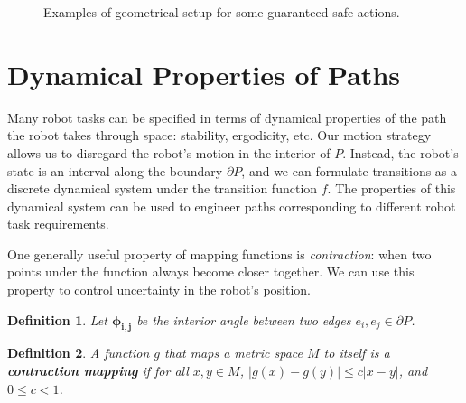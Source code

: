 \documentclass[]{article}
\newtheorem{definition}{Definition}
\begin{document}
\begin{figure}
\begin{subfigure}{0.4\textwidth}
\centering
{}
\end{subfigure}
\caption{Examples of geometrical setup for some guaranteed safe actions.}
\label{fig:two_safe_cases}
\end{figure}


\section{Dynamical Properties of Paths} \label{secdyn}


Many robot tasks can be specified in terms of dynamical properties of
the path the robot takes through space: stability, ergodicity, etc.
Our motion strategy allows us to disregard the robot's motion in the interior of
$P$. Instead, the robot's state is an interval 
along the boundary $\partial P$, and we can formulate transitions as a discrete
dynamical system under the transition function $f$. The properties of this
dynamical system can be used to engineer paths corresponding to different robot
task requirements.

One generally useful property of mapping functions is \emph{contraction}: 
when two points under the function always become closer together. 
We can use this property to control uncertainty in the robot's position.

\begin{definition}
Let $\bm{\phi_{i,j}}$ be the interior angle between two edges $e_i, e_j \in \partial P$. 
\end{definition}

\begin{definition}

A function $g$ that maps a metric space $M$ to itself is a \textbf{contraction
mapping} if for all
$x, y \in M$, $\lvert g(x) - g(y) \rvert \leq c \lvert x-y \rvert$, and $0 \leq c < 1$.
\end{definition}
\end{document}
